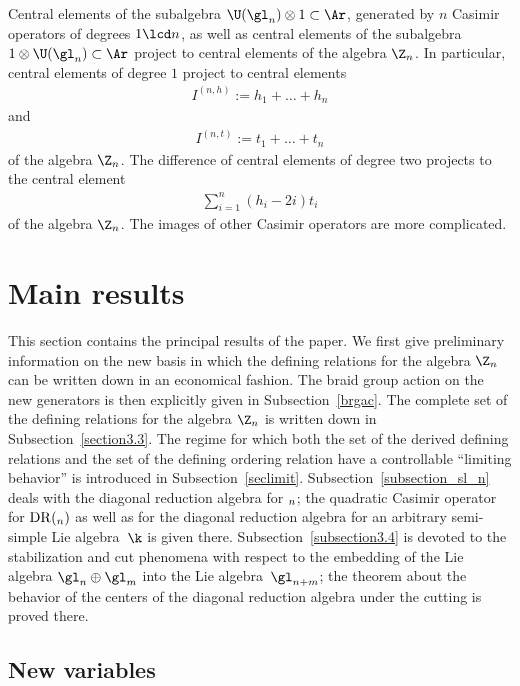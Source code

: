 \documentclass[11pt]{article}
\numberwithin{equation}{section}
\begin{document}
Central elements of the subalgebra $\U(\gl_n)\otimes 1\subset \Ar$, generated by $n$ Casimir
operators of degrees $1\lcd n$,  as well as central elements of the subalgebra
$1\otimes \U(\gl_n)\subset \Ar$ project to central elements of the algebra $\Z_n$. In particular,
central elements of degree $1$ project to central elements
\begin{gather}
I^{(n,h)}:=h_1+\dots +h_n\label{clih}
\end{gather}
and
\begin{gather}
\label{clit} I^{(n,t)}:=t_1+\dots +t_n
\end{gather}
of the algebra $\Z_n$. The dif\/ference of central elements of degree two projects to the central element
\begin{gather}
\label{drclit}
\sum_{i=1}^n(h_i-2i)t_i
\end{gather}
of the algebra $\Z_n$. The images of other Casimir operators are more complicated.


\section{Main results}

This section contains the principal results of the paper. We f\/irst give
preliminary information on the new basis in which the def\/ining relations for the
algebra $\Z_n$ can be written down in an economical fashion. The braid group action on the new generators is then
explicitly given in Subsection~\ref{brgac}. The complete set of the def\/ining relations for the algebra $\Z_n$ is written down in Subsection~\ref{section3.3}. The regime for which both
the set of the derived def\/ining relations and the set of the def\/ining ordering relation have a controllable ``limiting behavior'' is introduced in Subsection~\ref{seclimit}. Subsection~\ref{subsection_sl_n} deals with the diagonal reduction algebra for $\sl_n$; the quadratic Casimir operator for
${\mathrm{DR}}(\sl_n)$ as well as for the diagonal reduction algebra for an arbitrary semi-simple
Lie algebra~$\k$ is given there. Subsection~\ref{subsection3.4} is devoted to the stabilization and cut phenomena with respect to the embedding of the Lie algebra $\gl_n\oplus\gl_m$ into
the Lie algebra~$\gl_{n+m}$; the theorem about the behavior of the centers of the diagonal reduction algebra under the cutting is proved there.

\subsection{New variables}
\end{document}
